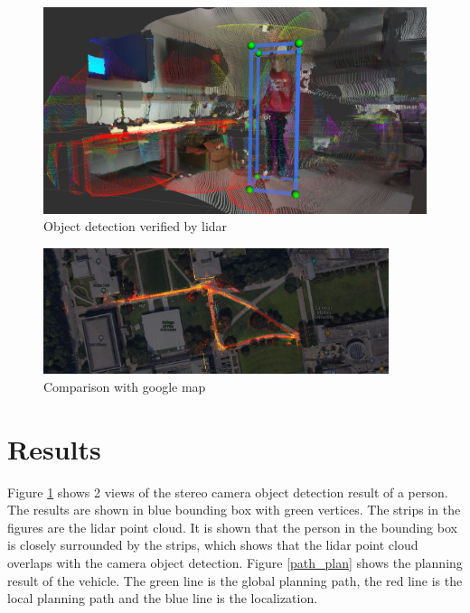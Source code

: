 \documentclass[balance,upint,subscriptcorrection,varvw,nofoot, mathalfa=cal=boondoxo,spanish,french,vietnamese,russian,greek,pdf-a,fontspec,colorlinks]{asmeconf}
\begin{document}
\begin{figure}
\centering\includegraphics[width=0.7\linewidth]{obj_det.png}
\caption{Object detection verified by lidar}\label{obj_det}
\end{figure}




\begin{figure}
	\center
	\includegraphics[width=0.9\textwidth]{map_psed_hunt.png}
	\caption{Comparison with google map}\label{hunt}
	\end{figure}






\section{Results}

Figure \ref{obj_det} shows 2 views of the stereo camera object detection result of a person. The results are shown in blue bounding box with green vertices. The strips in the figures are the lidar point cloud. It is shown that the person in the bounding box is closely surrounded by the strips, which shows that the lidar point cloud overlaps with the camera object detection. Figure \ref{path_plan} shows the planning result of the vehicle. The green line is the global planning path, the red line is the local planning path and the blue line is the localization.
\end{document}
